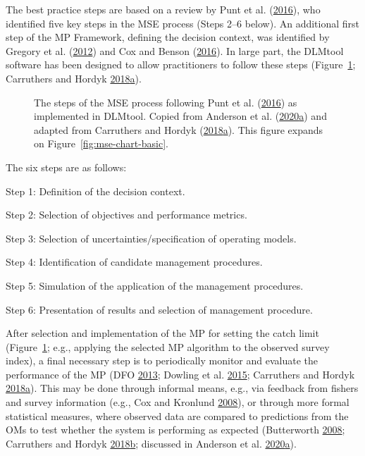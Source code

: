 \documentclass[11pt]{book}
\begin{document}
The best practice steps are based on a review by Punt et al. (\protect\hyperlink{ref-punt2016}{2016}), who identified five key steps in the MSE process (Steps 2--6 below). An additional first step of the MP Framework, defining the decision context, was identified by Gregory et al. (\protect\hyperlink{ref-gregory2012}{2012}) and Cox and Benson (\protect\hyperlink{ref-cox2016}{2016}). In large part, the DLMtool software has been designed to allow practitioners to follow these steps (Figure~\ref{fig:mse-chart}; Carruthers and Hordyk \protect\hyperlink{ref-carruthers2018}{2018}\protect\hyperlink{ref-carruthers2018}{a}).


\begin{figure}[htb]

{\centering {} 

}

\caption{The steps of the MSE process following Punt et al. (\protect\hyperlink{ref-punt2016}{2016}) as implemented in DLMtool. Copied from Anderson et al. (\protect\hyperlink{ref-anderson2020gfmp}{2020}\protect\hyperlink{ref-anderson2020gfmp}{a}) and adapted from Carruthers and Hordyk (\protect\hyperlink{ref-carruthers2018}{2018}\protect\hyperlink{ref-carruthers2018}{a}). This figure expands on Figure~\ref{fig:mse-chart-basic}.}\label{fig:mse-chart}
\end{figure}
The six steps are as follows:

Step 1: Definition of the decision context.

Step 2: Selection of objectives and performance metrics.

Step 3: Selection of uncertainties/specification of operating models.

Step 4: Identification of candidate management procedures.

Step 5: Simulation of the application of the management procedures.

Step 6: Presentation of results and selection of management procedure.

After selection and implementation of the MP for setting the catch limit (Figure~\ref{fig:mse-chart}; e.g., applying the selected MP algorithm to the observed survey index), a final necessary step is to periodically monitor and evaluate the performance of the MP (DFO \protect\hyperlink{ref-dfo2013}{2013}; Dowling et al. \protect\hyperlink{ref-dowling2015a}{2015}; Carruthers and Hordyk \protect\hyperlink{ref-carruthers2018}{2018}\protect\hyperlink{ref-carruthers2018}{a}). This may be done through informal means, e.g., via feedback from fishers and survey information (e.g., Cox and Kronlund \protect\hyperlink{ref-cox2008a}{2008}), or through more formal statistical measures, where observed data are compared to predictions from the OMs to test whether the system is performing as expected (Butterworth \protect\hyperlink{ref-butterworth2008}{2008}; Carruthers and Hordyk \protect\hyperlink{ref-carruthers_hordyk_2018}{2018}\protect\hyperlink{ref-carruthers_hordyk_2018}{b}; discussed in Anderson et al. \protect\hyperlink{ref-anderson2020gfmp}{2020}\protect\hyperlink{ref-anderson2020gfmp}{a}).
\end{document}
